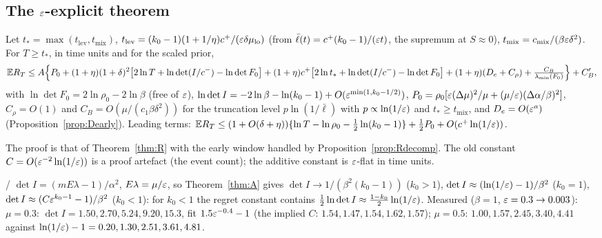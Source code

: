 \subsection{The $\varepsilon$-explicit theorem}\label{sec:eps-thm}

\begin{theorem}[explicit constants, $K=1$, $k_0>1$]\label{thm:eps}\Ps{}
Let $t_*=\max(t_{\mathrm{lev}},t_{\mathrm{mix}})$, $t_{\mathrm{lev}}=(k_0-1)(1+1/\eta)c^+/(\varepsilon\delta\mu_{\mathrm{lo}})$ (from $\bar\ell(t)=c^+(k_0-1)/(\varepsilon t)$, the supremum at $S\approx0$), $t_{\mathrm{mix}}=c_{\mathrm{mix}}/(\beta\varepsilon\delta^2)$. For $T\ge t_*$, in time units and for the scaled prior,
\[
\mathbb{E} R_T\le A\Big\{P_0+(1+\eta)(1+\delta)^2\big[2\ln T+\ln\det(I/c^-)-\ln\det F_0\big]+(1+\eta)c^+\big[2\ln t_*+\ln\det(I/c^-)-\ln\det F_0\big]+(1+\eta)(D_e+C_\rho)+\tfrac{C_B}{\lambda_{\min}(F_0)}\Big\}+C_B',
\]
with $\ln\det F_0=2\ln\rho_0-2\ln\beta$ (free of $\varepsilon$), $\ln\det I=-2\ln\beta-\ln(k_0-1)+O(\varepsilon^{\min(1,k_0-1/2)})$, $P_0=\rho_0[\varepsilon(\Delta\mu)^2/\mu+(\mu/\varepsilon)(\Delta\alpha/\beta)^2]$, $C_\rho=O(1)$ and $C_B=O(\mu/(c_1\beta\delta^2))$ for the truncation level $p\ln(1/\bar\ell)$ with $p\propto\ln(1/\varepsilon)$ and $t_*\ge t_{\mathrm{mix}}$, and $D_e=O(\varepsilon^a)$ (Proposition~\ref{prop:Dearly}). Leading terms: $\mathbb{E} R_T\le(1+O(\delta+\eta))\{\ln T-\ln\rho_0-\tfrac12\ln(k_0-1)\}+\tfrac12P_0+O(c^+\ln(1/\varepsilon))$.
\end{theorem}
The proof is that of Theorem~\ref{thm:R} with the early window handled by Proposition~\ref{prop:Rdecomp}. The old constant $C=O(\varepsilon^{-2}\ln(1/\varepsilon))$ is a proof artefact (the event count); the additive constant is $\varepsilon$-flat in time units.

\begin{proposition}\label{prop:k0low}\Pt{}/\Nt{}
$\det I=(mE\lambda-1)/\alpha^2$, $E\lambda=\mu/\varepsilon$, so Theorem~\ref{thm:A} gives $\det I\to1/(\beta^2(k_0-1))$ ($k_0>1$), $\det I\approx(\ln(1/\varepsilon)-1)/\beta^2$ ($k_0=1$), $\det I\approx(C\varepsilon^{k_0-1}-1)/\beta^2$ ($k_0<1$): for $k_0<1$ the regret constant contains $\tfrac12\ln\det I\approx\tfrac{1-k_0}2\ln(1/\varepsilon)$. Measured ($\beta=1$, $\varepsilon=0.3\to0.003$): $\mu=0.3$: $\det I=1.50,2.70,5.24,9.20,15.3$, fit $1.5\varepsilon^{-0.4}-1$ (the implied $C$: $1.54,1.47,1.54,1.62,1.57$); $\mu=0.5$: $1.00,1.57,2.45,3.40,4.41$ against $\ln(1/\varepsilon)-1=0.20,1.30,2.51,3.61,4.81$.
\end{proposition}

